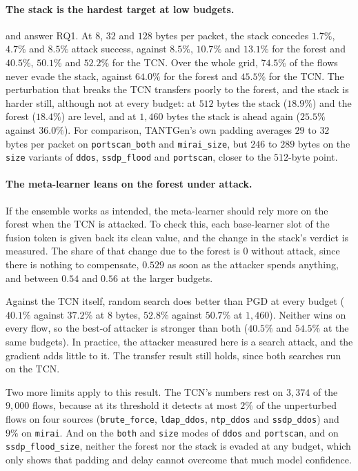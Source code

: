 \paragraph{The stack is the hardest target at low budgets.}
 and  answer RQ1. At $8$, $32$
and $128$ bytes per packet, the stack concedes $1.7\%$, $4.7\%$ and $8.5\%$ attack
success, against $8.5\%$, $10.7\%$ and $13.1\%$ for the forest and $40.5\%$, $50.1\%$
and $52.2\%$ for the \ac{TCN}. Over the whole grid, $74.5\%$ of the flows never evade the stack, against
$64.0\%$ for the forest and $45.5\%$ for the \ac{TCN}. The perturbation that breaks the
\ac{TCN} transfers poorly to the forest, and the stack is harder still, although not at
every budget: at $512$ bytes the stack ($18.9\%$) and the forest ($18.4\%$) are level,
and at $1{,}460$ bytes the stack is ahead again ($25.5\%$ against $36.0\%$). For
comparison, TANTGen's own padding averages $29$ to $32$ bytes per packet on
\texttt{portscan\_both} and \texttt{mirai\_size}, but $246$ to $289$ bytes on the
\texttt{size} variants of \texttt{ddos}, \texttt{ssdp\_flood} and \texttt{portscan},
closer to the $512$-byte point.

\paragraph{The meta-learner leans on the forest under attack.}
If the ensemble works as intended, the meta-learner should rely more on the forest when
the \ac{TCN} is attacked. To check this, each base-learner slot of the fusion token is given
back its clean value, and the change in the stack's verdict is measured. The share of
that change due to the forest is $0$ without attack, since there is nothing to
compensate, $0.529$ as soon as the attacker spends anything, and between $0.54$ and
$0.56$ at the larger budgets.

Against the \ac{TCN} itself, random search does better than \ac{PGD} at every budget
($40.1\%$ against $37.2\%$ at $8$ bytes, $52.8\%$ against $50.7\%$ at $1{,}460$). Neither
wins on every flow, so the best-of attacker is stronger than both ($40.5\%$ and $54.5\%$
at the same budgets). In practice, the attacker measured here is a search attack, and
the gradient adds little to it. The transfer result still holds, since both searches run
on the \ac{TCN}.

Two more limits apply to this result. The \ac{TCN}'s numbers rest on $3{,}374$ of the
$9{,}000$ flows, because at its threshold it detects at most $2\%$ of the unperturbed
flows on four sources (\texttt{brute\_force}, \texttt{ldap\_ddos}, \texttt{ntp\_ddos}
and \texttt{ssdp\_ddos}) and $9\%$ on \texttt{mirai}. And on the \texttt{both} and
\texttt{size} modes of \texttt{ddos} and \texttt{portscan}, and on
\texttt{ssdp\_flood\_size}, neither the forest nor the stack is evaded at any budget,
which only shows that padding and delay cannot overcome that much model confidence.

